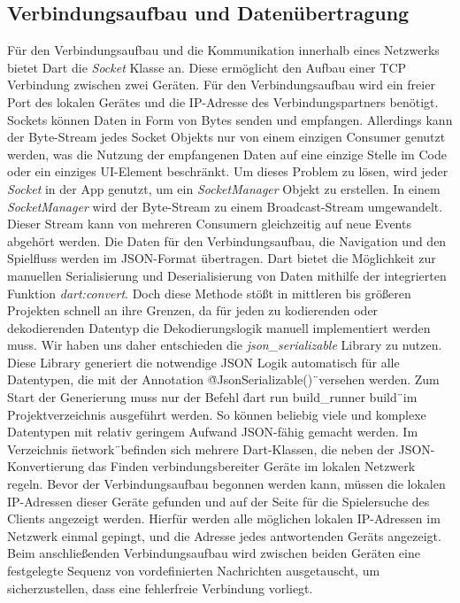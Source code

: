 \subsection{Verbindungsaufbau und Datenübertragung}
Für den Verbindungsaufbau und die Kommunikation innerhalb eines Netzwerks bietet Dart die \textit{Socket} Klasse an. Diese ermöglicht den Aufbau einer TCP Verbindung  zwischen zwei Geräten. Für den Verbindungsaufbau wird ein freier Port des lokalen Gerätes und die IP-Adresse des Verbindungspartners benötigt.
\newline
Sockets können Daten in Form von Bytes senden und empfangen. Allerdings kann der Byte-Stream jedes Socket Objekts nur von einem einzigen Consumer genutzt werden, was die Nutzung der empfangenen Daten auf eine einzige Stelle im Code oder ein einziges UI-Element beschränkt. Um dieses Problem zu lösen, wird jeder \textit{Socket} in der App genutzt, um ein \textit{SocketManager} Objekt zu erstellen. In einem \textit{SocketManager} wird der Byte-Stream zu einem Broadcast-Stream umgewandelt. Dieser Stream kann von mehreren Consumern gleichzeitig auf neue Events abgehört werden. 
\newline
\newline
Die Daten für den Verbindungsaufbau, die Navigation und den Spielfluss werden im JSON-Format übertragen. Dart bietet die Möglichkeit zur manuellen Serialisierung und Deserialisierung von Daten mithilfe der integrierten Funktion \textit{dart:convert}. Doch diese Methode stößt in mittleren bis größeren Projekten schnell an ihre Grenzen, da für jeden zu kodierenden oder dekodierenden Datentyp die Dekodierungslogik manuell implementiert werden muss.  Wir haben uns daher entschieden die \textit{json\_serializable} Library zu nutzen. Diese Library generiert die notwendige JSON Logik automatisch für alle Datentypen, die mit der Annotation \"@JsonSerializable()\"\ versehen werden. Zum Start der Generierung muss nur der Befehl \"dart run build\_runner build\"\ im Projektverzeichnis ausgeführt werden. So können beliebig viele und komplexe Datentypen mit relativ geringem Aufwand JSON-fähig gemacht werden. 
\newline
\newline
Im Verzeichnis \"network\"\ befinden sich mehrere Dart-Klassen, die neben der JSON-Konvertierung das Finden verbindungsbereiter Geräte im lokalen Netzwerk regeln. Bevor der Verbindungsaufbau begonnen werden kann, müssen die lokalen IP-Adressen dieser Geräte gefunden und auf der Seite für die Spielersuche des Clients angezeigt werden. Hierfür werden alle möglichen lokalen IP-Adressen im Netzwerk einmal gepingt, und die Adresse jedes antwortenden Geräts angezeigt. Beim anschließenden Verbindungsaufbau wird zwischen beiden Geräten eine festgelegte Sequenz von vordefinierten Nachrichten ausgetauscht, um sicherzustellen, dass eine fehlerfreie Verbindung vorliegt. 

